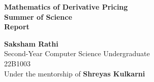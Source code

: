 \documentclass{report}
\begin{document}
\begin{titlepage}
\centering
\vspace*{\fill}

\textbf{\Huge Mathematics of Derivative Pricing} \\
\vspace{0.5cm}
\textbf{\LARGE Summer of Science} \\
\vspace{0.5cm}
\textbf{\Large Report} \\
\vspace{14cm}

\textbf{\LARGE Saksham Rathi}\\
\large Second-Year Computer Science Undergraduate\\
\large 22B1003\\
\large Under the mentorship of \textbf{Shreyas Kulkarni}\\
\end{titlepage}


\tableofcontents

\newpage
\mbox{}
\newpage

\end{document}
